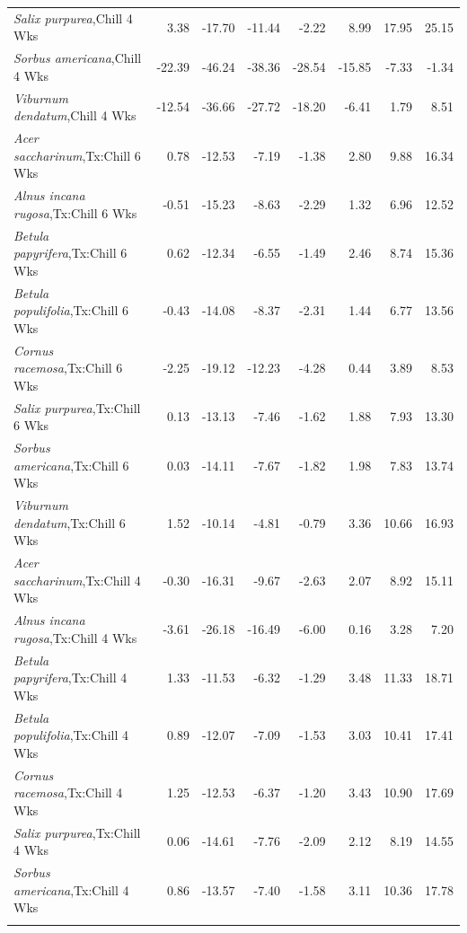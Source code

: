 \documentclass{article}\usepackage[]{graphicx}\usepackage[]{color}
\begin{document}
\begin{longtable}{lrrrrrrr}
  \textit{Salix purpurea},Chill 4 Wks & 3.38 & -17.70 & -11.44 & -2.22 & 8.99 & 17.95 & 25.15 \\ 
  \textit{Sorbus americana},Chill 4 Wks & -22.39 & -46.24 & -38.36 & -28.54 & -15.85 & -7.33 & -1.34 \\ 
  \textit{Viburnum dendatum},Chill 4 Wks & -12.54 & -36.66 & -27.72 & -18.20 & -6.41 & 1.79 & 8.51 \\ 
  \textit{Acer saccharinum},Tx:Chill 6 Wks & 0.78 & -12.53 & -7.19 & -1.38 & 2.80 & 9.88 & 16.34 \\ 
  \textit{Alnus incana rugosa},Tx:Chill 6 Wks & -0.51 & -15.23 & -8.63 & -2.29 & 1.32 & 6.96 & 12.52 \\ 
  \textit{Betula papyrifera},Tx:Chill 6 Wks & 0.62 & -12.34 & -6.55 & -1.49 & 2.46 & 8.74 & 15.36 \\ 
  \textit{Betula populifolia},Tx:Chill 6 Wks & -0.43 & -14.08 & -8.37 & -2.31 & 1.44 & 6.77 & 13.56 \\ 
  \textit{Cornus racemosa},Tx:Chill 6 Wks & -2.25 & -19.12 & -12.23 & -4.28 & 0.44 & 3.89 & 8.53 \\ 
  \textit{Salix purpurea},Tx:Chill 6 Wks & 0.13 & -13.13 & -7.46 & -1.62 & 1.88 & 7.93 & 13.30 \\ 
  \textit{Sorbus americana},Tx:Chill 6 Wks & 0.03 & -14.11 & -7.67 & -1.82 & 1.98 & 7.83 & 13.74 \\ 
  \textit{Viburnum dendatum},Tx:Chill 6 Wks & 1.52 & -10.14 & -4.81 & -0.79 & 3.36 & 10.66 & 16.93 \\ 
  \textit{Acer saccharinum},Tx:Chill 4 Wks & -0.30 & -16.31 & -9.67 & -2.63 & 2.07 & 8.92 & 15.11 \\ 
  \textit{Alnus incana rugosa},Tx:Chill 4 Wks & -3.61 & -26.18 & -16.49 & -6.00 & 0.16 & 3.28 & 7.20 \\ 
  \textit{Betula papyrifera},Tx:Chill 4 Wks & 1.33 & -11.53 & -6.32 & -1.29 & 3.48 & 11.33 & 18.71 \\ 
  \textit{Betula populifolia},Tx:Chill 4 Wks & 0.89 & -12.07 & -7.09 & -1.53 & 3.03 & 10.41 & 17.41 \\ 
  \textit{Cornus racemosa},Tx:Chill 4 Wks & 1.25 & -12.53 & -6.37 & -1.20 & 3.43 & 10.90 & 17.69 \\ 
  \textit{Salix purpurea},Tx:Chill 4 Wks & 0.06 & -14.61 & -7.76 & -2.09 & 2.12 & 8.19 & 14.55 \\ 
  \textit{Sorbus americana},Tx:Chill 4 Wks & 0.86 & -13.57 & -7.40 & -1.58 & 3.11 & 10.36 & 17.78 \\ 
   \hline
\hline
\label{tab:suppmodthick}
\end{longtable}
\end{document}
